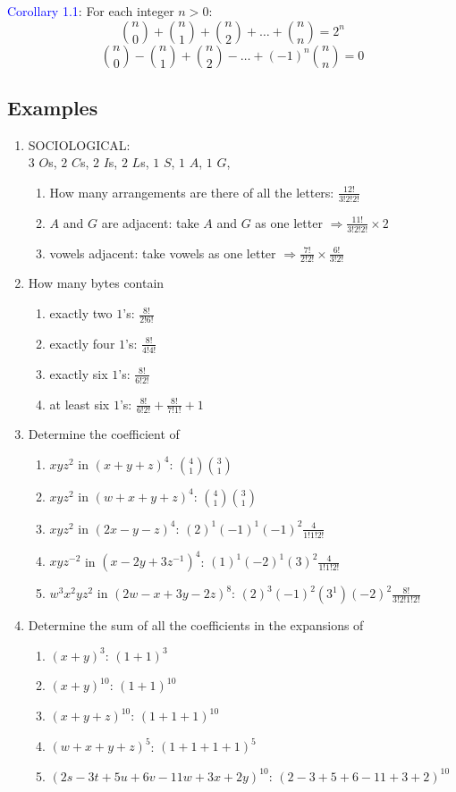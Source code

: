\documentclass[a4paper]{article}
\begin{document}
\textcolor{blue}{Corollary 1.1}: For each integer $n>0$:
$$
\binom{n}{0}+\binom{n}{1}+\binom{n}{2}+\dots+\binom{n}{n}=2^n
$$
$$
\binom{n}{0}-\binom{n}{1}+\binom{n}{2}-\dots+(-1)^n\binom{n}{n}=0
$$
\subsection*{Examples}
\begin{enumerate}
    \item SOCIOLOGICAL:\\
    $3$ $O$s, $2$ $C$s, $2$ $I$s, $2$ $L$s, $1$ $S$, $1$ $A$, $1$ $G$,  
    \begin{enumerate}
        \item How many arrangements are there of all the letters: $\frac{12!}{3!2!2!}$
        \item $A$ and $G$ are adjacent: take $A$ and $G$ as one letter $\Rightarrow \frac{11!}{3!2!2!}\times 2$
        \item vowels adjacent: take vowels as one letter $\Rightarrow\frac{7!}{2!2!}\times \frac{6!}{3!2!}$
    \end{enumerate}
    \item How many bytes contain
    \begin{enumerate}
        \item exactly two $1$'s: $\frac{8!}{2!6!}$
        \item exactly four $1$'s: $\frac{8!}{4!4!}$
        \item exactly six $1$'s: $\frac{8!}{6!2!}$
        \item at least six $1$'s: $\frac{8!}{6!2!}+\frac{8!}{7!1!}+1$
    \end{enumerate}
    \item Determine the coefficient of
    \begin{enumerate}
        \item $xyz^2$ in $(x+y+z)^4$: $\binom{4}{1}\binom{3}{1}$
        \item $xyz^2$ in $(w+x+y+z)^4$: $\binom{4}{1}\binom{3}{1}$
        \item $xyz^2$ in $(2x-y-z)^4$: $(2)^1(-1)^1(-1)^2\frac{4}{1!1!2!}$
        \item $xyz^{-2}$ in $(x-2y+3z^{-1})^4$: $(1)^1(-2)^1(3)^{2}\frac{4}{1!1!2!}$
        \item $w^3x^2yz^2$ in $(2w-x+3y-2z)^8$: $(2)^3(-1)^2(3^1)(-2)^2\frac{8!}{3!2!1!2!}$
    \end{enumerate}
    \item Determine the sum of all the coefficients in the expansions of
    \begin{enumerate}
        \item $(x+y)^3$: $(1+1)^3$
        \item $(x+y)^{10}$: $(1+1)^{10}$
        \item $(x+y+z)^{10}$: $(1+1+1)^{10}$
        \item $(w+x+y+z)^5$: $(1+1+1+1)^5$
        \item $(2s-3t+5u+6v-11w+3x+2y)^{10}$: $(2-3+5+6-11+3+2)^{10}$
    \end{enumerate}
\end{enumerate}
\end{document}
